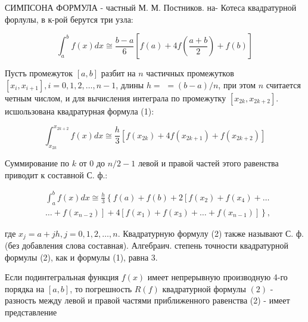 \documentclass[10pt]{article}
\begin{document}
СИМПСОНА ФОРМУЛА - частный М. М. Постников. на- Котеса квадратурной форлулы, в к-рой берутся три узла:



\[

\int_{a}^{b} f(x) d x \cong \frac{b-a}{6}\left[f(a)+4 f\left(\frac{a+b}{2}\right)+f(b)\right]

\]



Пустъ промежуток $[a, b]$ разбит на $n$ частичных промежутков $\left[x_{i}, x_{i+1}\right], i=0,1,2, \ldots, n-1$, длины $h=$ $=(b-a) / n$, при этом $n$ считается четным числом, и для вычисления интеграла по промежутку $\left[x_{2 k}, x_{2 k+2}\right]$. исшользована квадратурная формула (1):



\[

\int_{x_{2 k}}^{x_{2 k+2}} f(x) d x \cong \frac{h}{3}\left[f\left(x_{2 k}\right)+4 f\left(x_{2 k+1}\right)+f\left(x_{2 k+2}\right)\right]

\]



Суммирование по $k$ от 0 до $n / 2-1$ левой и правой частей этого равенства приводит к составной С. ф.:



\[

\begin{aligned}

& \int_{a}^{b} f(x) d x \cong \frac{h}{3}\left\{f(a)+f(b)+2\left[f\left(x_{2}\right)+f\left(x_{4}\right)+\ldots\right.\right. \\

& \left.\left.\ldots+f\left(x_{n-2}\right)\right]+4\left[f\left(x_{1}\right)+f\left(x_{3}\right)+\ldots+f\left(x_{n-1}\right)\right]\right\},

\end{aligned}

\]



где $x_{j}=a+j h, j=0,1,2, \ldots, n$. Квадратурную формулу (2) также называют С. ф. (без добавления слова составная). Алгебраич. степень точности квадратурной формулы (2), как и формулы (1), равна 3.



Если подинтегральная функция $f(x)$ имеет непрерывную производную 4-го порядка на $[a, b]$, то погрешность $R(f)$ квадратурной формулы $(2)$ - разность между левой и правой частями приближенного равенства (2) - имеет представление
\end{document}
